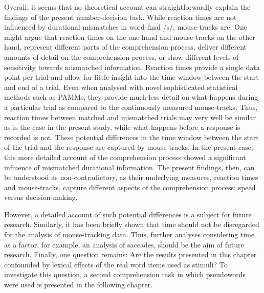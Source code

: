 Overall, it seems that no theoretical account can straightforwardly explain the findings of the present number-decision task. While reaction times are not influenced by durational mismatches in word-final /s/, mouse-tracks are. One might argue that reaction times on the one hand and mouse-tracks on the other hand, represent different parts of the comprehension process, deliver different amounts of detail on the comprehension process, or show different levels of sensitivity towards mismatched information. Reaction times provide a single data point per trial and allow for little insight into the time window between the start and end of a trial. Even when analysed with novel sophisticated statistical methods such as PAMMs, they provide much less detail on what happens during a particular trial as compared to the continuously measured mouse-tracks. Thus, reaction times between matched and mismatched trials may very well be similar as is the case in the present study, while what happens before a response is recorded is not. These potential differences in the time window between the start of the trial and the response are captured by mouse-tracks. In the present case, this more detailed account of the comprehension process showed a significant influence of mismatched durational information. The present findings, then, can be understood as non-contradictory, as their underlying measures, reaction times and mouse-tracks, capture different aspects of the comprehension process: speed versus decision-making.

However, a detailed account of such potential differences is a subject for future research. Similarly, it has been briefly shown that time should not be disregarded for the analysis of mouse-tracking data. Thus, further analyses considering time as a factor, for example, an analysis of saccades, should be the aim of future research. Finally, one question remains: Are the results presented in this chapter confounded by lexical effects of the real word items used as stimuli? To investigate this question, a second comprehension task in which pseudowords were used is presented in the following chapter.
